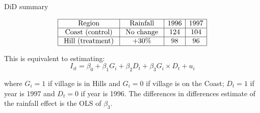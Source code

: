 \documentclass[11pt]{beamer}
\begin{document}
\begin{frame}{DiD summary}

$$
\begin{array}{|c|c|c|c|}
\hline \text { Region } & \text { Rainfall } & 1996 & 1997 \\
\hline \text { Coast (control) } & \text { No change } & 124 & 104 \\
\hline \text { Hill (treatment) } & +30 \% & 98 & 96 \\
\hline
\end{array}
$$

This is equivalent to estimating:
$$I_{it}=\beta_0+\beta_1 G_i+\beta_2 D_t+\beta_3 G_i \times D_t+u_i $$

where 
 $G_i=1$ if village is in Hills and $G_i=0$ if village is on the Coast; $D_t=1$ if year is 1997 and $D_t=0$ if year is 1996. The differences in differences estimate of the rainfall effect is the OLS of $\beta_3$.


\end{frame}
\end{document}
